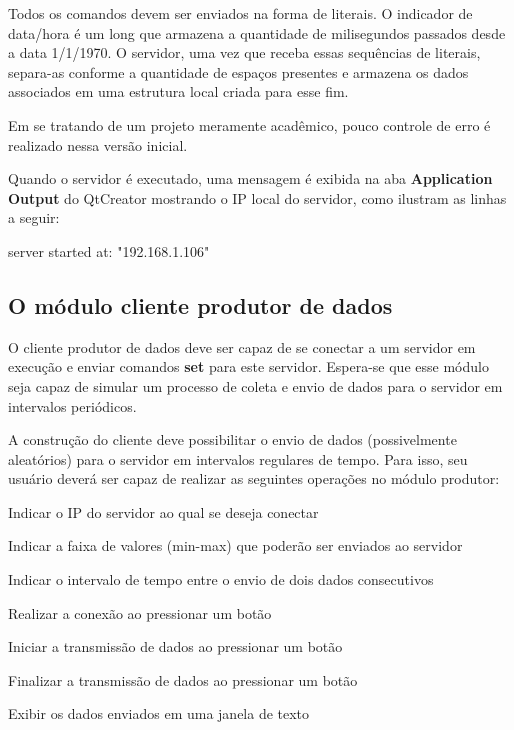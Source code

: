 

Todos os comandos devem ser enviados na forma de literais. O indicador de data/hora é um long que armazena a quantidade de milisegundos passados desde a data 1/1/1970. O servidor, uma vez que receba essas sequências de literais, separa-\/as conforme a quantidade de espaços presentes e armazena os dados associados em uma estrutura local criada para esse fim.

Em se tratando de um projeto meramente acadêmico, pouco controle de erro é realizado nessa versão inicial.

Quando o servidor é executado, uma mensagem é exibida na aba {\bfseries Application Output} do Qt\+Creator mostrando o IP local do servidor, como ilustram as linhas a seguir\+:


\begin{DoxyCode}
server started at:
"192.168.1.106"
\end{DoxyCode}


\subsection*{O módulo cliente produtor de dados}

O cliente produtor de dados deve ser capaz de se conectar a um servidor em execução e enviar comandos {\bfseries set} para este servidor. Espera-\/se que esse módulo seja capaz de simular um processo de coleta e envio de dados para o servidor em intervalos periódicos.

A construção do cliente deve possibilitar o envio de dados (possivelmente aleatórios) para o servidor em intervalos regulares de tempo. Para isso, seu usuário deverá ser capaz de realizar as seguintes operações no módulo produtor\+:


\begin{DoxyItemize}
\item Indicar o IP do servidor ao qual se deseja conectar
\item Indicar a faixa de valores (min-\/max) que poderão ser enviados ao servidor
\item Indicar o intervalo de tempo entre o envio de dois dados consecutivos
\item Realizar a conexão ao pressionar um botão
\item Iniciar a transmissão de dados ao pressionar um botão
\item Finalizar a transmissão de dados ao pressionar um botão
\item Exibir os dados enviados em uma janela de texto
\end{DoxyItemize}


